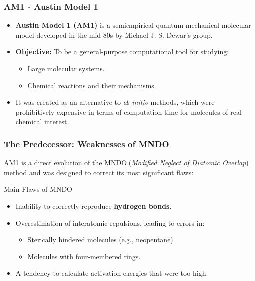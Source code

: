 \begin{frame}
  \frametitle{AM1 - Austin Model 1}
  
  \begin{itemize}
    \item \textbf{Austin Model 1 (AM1)} is a semiempirical quantum mechanical molecular model developed in the mid-80s by Michael J. S. Dewar's group. \pause
    \item \textbf{Objective:} To be a general-purpose computational tool for studying: \pause
    \begin{itemize}
        \item Large molecular systems. \pause
        \item Chemical reactions and their mechanisms. \pause
    \end{itemize}
    \item It was created as an alternative to \textit{ab initio} methods, which were prohibitively expensive in terms of computation time for molecules of real chemical interest.
  \end{itemize}
\end{frame}

\begin{frame}
  \frametitle{The Predecessor: Weaknesses of MNDO}
  
  AM1 is a direct evolution of the MNDO (\textit{Modified Neglect of Diatomic Overlap}) method and was designed to correct its most significant flaws: \pause
  
  \begin{block}{Main Flaws of MNDO}
    \begin{itemize}
      \item Inability to correctly reproduce \textbf{hydrogen bonds}. \pause
      \item Overestimation of interatomic repulsions, leading to errors in: \pause
      \begin{itemize}
          \item Sterically hindered molecules (e.g., neopentane). \pause
          \item Molecules with four-membered rings. \pause
      \end{itemize}
      \item A tendency to calculate activation energies that were too high.
    \end{itemize}
  \end{block}
\end{frame}


